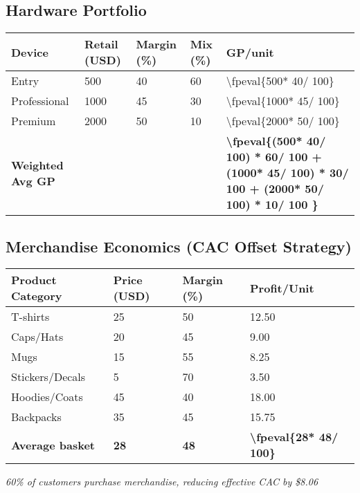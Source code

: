 \documentclass[11pt]{article}
\newcommand{\numfpeval}[1]{\num{\fpeval{#1}}}
\newcommand{\hwEntryPrice}{500}
\newcommand{\hwEntryMargin}{40}
\newcommand{\hwEntryMix}{60}
\newcommand{\hwProfPrice}{1000}
\newcommand{\hwProfMargin}{45}
\newcommand{\hwProfMix}{30}
\newcommand{\hwPremiumPrice}{2000}
\newcommand{\hwPremiumMargin}{50}
\newcommand{\hwPremiumMix}{10}
\newcommand{\merchAvgPrice}{28}
\newcommand{\merchAvgMargin}{48}
\newcommand{\merchAvgProfit}{\fpeval{\merchAvgPrice * \merchAvgMargin / 100}}
\newcommand{\merchAttachRate}{60}
\begin{document}
\subsection{Hardware Portfolio}
\begin{table}[H]
\centering
\begin{tabularx}{\linewidth}{l Y Y Y Y}
\toprule
Device & Retail (USD) & Margin (\%)\cite{industrybenchmark2024} & Mix (\%) & GP/unit \\\midrule
Entry        & \num{\hwEntryPrice}  & \num{\hwEntryMargin} & \num{\hwEntryMix} & \numfpeval{\hwEntryPrice * \hwEntryMargin / 100} \\
Professional & \num{\hwProfPrice} & \num{\hwProfMargin} & \num{\hwProfMix} & \numfpeval{\hwProfPrice * \hwProfMargin / 100} \\
Premium      & \num{\hwPremiumPrice} & \num{\hwPremiumMargin} & \num{\hwPremiumMix} & \numfpeval{\hwPremiumPrice * \hwPremiumMargin / 100} \\\midrule
\textbf{Weighted Avg GP} &  &  &  & \textbf{\numfpeval{(\hwEntryPrice * \hwEntryMargin / 100) * \hwEntryMix / 100 + (\hwProfPrice * \hwProfMargin / 100) * \hwProfMix / 100 + (\hwPremiumPrice * \hwPremiumMargin / 100) * \hwPremiumMix / 100 }} \\
\bottomrule
\end{tabularx}
\end{table}

\subsection{Merchandise Economics (CAC Offset Strategy)}
\begin{table}[H]
\centering
\begin{tabularx}{\linewidth}{l Y Y Y}
\toprule
Product Category & Price (USD) & Margin (\%)\cite{printful2023} & Profit/Unit \\\midrule
T-shirts & 25 & 50 & 12.50 \\
Caps/Hats & 20 & 45 & 9.00 \\
Mugs & 15 & 55 & 8.25 \\
Stickers/Decals & 5 & 70 & 3.50 \\
Hoodies/Coats & 45 & 40 & 18.00 \\
Backpacks & 35 & 45 & 15.75 \\\midrule
\textbf{Average basket} & \textbf{\num{\merchAvgPrice}} & \textbf{\num{\merchAvgMargin}} & \textbf{\num[round-precision=2]{\merchAvgProfit}} \\
\bottomrule
\end{tabularx}
\end{table}
\textit{\merchAttachRate\% of customers purchase merchandise, reducing effective CAC by \$8.06}\cite{shopify2024}
\end{document}
